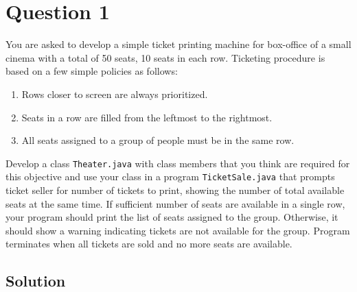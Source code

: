 \section*{Question 1}
You are asked to develop a simple ticket printing machine for box-office of a small cinema with a total of 50 seats, 10 seats in each row.
Ticketing procedure is based on a few simple policies as follows:

\begin{enumerate}[itemsep=-2mm,label={}]
	\item Rows closer to screen are always prioritized.
	\item Seats in a row are filled from the leftmost to the rightmost.
	\item All seats assigned to a group of people must be in the same row.
\end{enumerate}

Develop a class \texttt{Theater.java} with class members that you think are required for this objective and use your class in a program \texttt{TicketSale.java} that prompts ticket seller for number of tickets to print, showing the number of total available seats at the same time.
If sufficient number of seats are available in a single row, your program should print the list of seats assigned to the group.
Otherwise, it should show a warning indicating tickets are not available for the group.
Program terminates when all tickets are sold and no more seats are available.

\subsection*{Solution}


